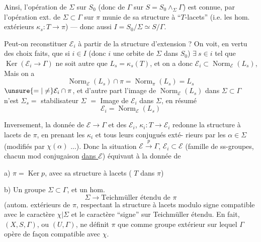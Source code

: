 
Ainsi, l'opération de
$\Sigma$ sur $S_0$ (donc de $\Gamma$ sur $S=S_0\wedge_{\Sigma}\Gamma$)
est connue, par l'opération ext. de $\Sigma\subset\Gamma$ sur
$\pi$ munie de sa structure  à
``$T$-lacets'' (i.e. les hom. extérieurs
$\kappa_s:T\longrightarrow\pi$) --- donc aussi $I=S_0/\Sigma\simeq S/\Gamma$.

Peut-on reconstituer $\mathcal E_i$  à partir de la
structure d'extension ? On voit, 
en vertu des choix faits,
que si $i\in I$ (donc $i$ une orbite de
$\Sigma$ dans $S_0$) $\exists\ s\in i$ tel que $\operatorname{Ker}(\mathcal E_i\longrightarrow\Gamma)$
ne soit autre que $L_s=\kappa_s(T)$, et on a
donc $\mathcal E_i\subset\operatorname{Norm}_{\mathcal E}(L_s)$, Mais
on a
\[
\operatorname{Norm}_{\mathcal E}(L_s)\cap\pi
=\operatorname{Norm}_{\pi}(L_s)=L_s
\]
$\unsure{=|\ne}\mathcal E_i\cap\pi$, et d'autre part l'image de
$\operatorname{Norm}_{\mathcal E}(L_s)$ dans $\Sigma\subset\Gamma$ n'est  \inserted{$\subset$}
$\Sigma_s=$ stabilisateur   $\Sigma$
$=$ Image de $\mathcal E_i$ dans $\Sigma$,
 en résumé
\[
\mathcal E_i=\operatorname{Norm}_{\mathcal E}(L_s)
\]


Inversement, la donnée de $\mathcal E\longrightarrow\Gamma$
et des $\mathcal E_i$, $\kappa_i:T\longrightarrow\mathcal E_i$ redonne la
structure à lacets de $\pi$, en prenant
les $\kappa_i$ et tous leurs conjugués exté-
rieurs  par les $\alpha\in\Sigma$ (modifiés par $\chi(\alpha)$ ...).
Donc la  situation $\mathcal E\xrightarrow{p}\Gamma$, $\mathcal E_i\subset\mathcal E$
 (famille de ss-groupes, chacun
 mod conjugaison \uline{dans $\mathcal E$}) équivaut
à la donnée de

a) $\pi=\operatorname{Ker}p$, avec sa structure à lacets
(
$T$ dans $\pi$)

b) Un  groupe $\Sigma\subset\Gamma$, et
un hom.
\[
\Sigma\longrightarrow\text{Teichmüller étendu de }\pi
\]
(autom. extérieurs de $\pi$,
respectant la structure à lacets
modulo signe
compatible avec le caractère $\chi|\Sigma$ et
le caractère ``signe'' sur Teichmüller étendu.
En fait, $(X,S,\Gamma)$, ou $(U,\Gamma)$, ne définit
$\pi$ que comme groupe extérieur  sur lequel
$\Gamma$ opère de façon compatible avec $\chi$.
